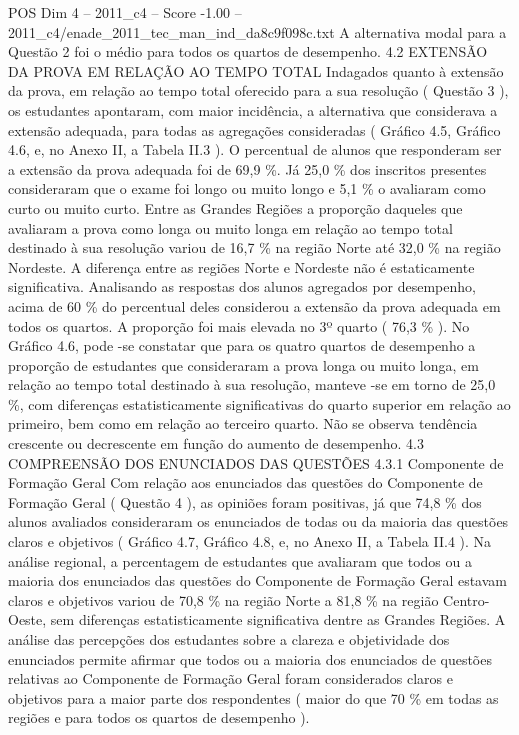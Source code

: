 \begin{textsample}{POS Dim 4 – 2011\_c4 – Score -1.00 – 2011\_c4/enade\_2011\_tec\_man\_ind\_da8c9f098c.txt}
A alternativa modal para a Questão 2 foi o médio para todos os quartos de desempenho. 4.2 EXTENSÃO DA PROVA EM RELAÇÃO AO TEMPO TOTAL Indagados quanto à extensão da prova, em relação ao tempo total oferecido para a sua resolução ( Questão 3 ), os estudantes apontaram, com maior incidência, a alternativa que considerava a extensão adequada, para todas as agregações consideradas ( Gráfico 4.5, Gráfico 4.6, e, no Anexo II, a Tabela II.3 ).
O percentual de alunos que responderam ser a extensão da prova adequada foi de 69,9 \%.
Já 25,0 \% dos inscritos presentes consideraram que o exame foi longo ou muito longo e 5,1 \% o avaliaram como curto ou muito curto.
Entre as Grandes Regiões a proporção daqueles que avaliaram a prova como longa ou muito longa em relação ao tempo total destinado à sua resolução variou de 16,7 \% na região Norte até 32,0 \% na região Nordeste.
A diferença entre as regiões Norte e Nordeste não é estaticamente significativa.
Analisando as respostas dos alunos agregados por desempenho, acima de 60 \% do percentual deles considerou a extensão da prova adequada em todos os quartos.
A proporção foi mais elevada no 3º quarto ( 76,3 \% ).
No Gráfico 4.6, pode -se constatar que para os quatro quartos de desempenho a proporção de estudantes que consideraram a prova longa ou muito longa, em relação ao tempo total destinado à sua resolução, manteve -se em torno de 25,0 \%, com diferenças estatisticamente significativas do quarto superior em relação ao primeiro, bem como em relação ao terceiro quarto.
Não se observa tendência crescente ou decrescente em função do aumento de desempenho. 4.3 COMPREENSÃO DOS ENUNCIADOS DAS QUESTÕES 4.3.1 Componente de Formação Geral Com relação aos enunciados das questões do Componente de Formação Geral ( Questão 4 ), as opiniões foram positivas, já que 74,8 \% dos alunos avaliados consideraram os enunciados de todas ou da maioria das questões claros e objetivos ( Gráfico 4.7, Gráfico 4.8, e, no Anexo II, a Tabela II.4 ).
Na análise regional, a percentagem de estudantes que avaliaram que todos ou a maioria dos enunciados das questões do Componente de Formação Geral estavam claros e objetivos variou de 70,8 \% na região Norte a 81,8 \% na região Centro-Oeste, sem diferenças estatisticamente significativa dentre as Grandes Regiões.
A análise das percepções dos estudantes sobre a clareza e objetividade dos enunciados permite afirmar que todos ou a maioria dos enunciados de questões relativas ao Componente de Formação Geral foram considerados claros e objetivos para a maior parte dos respondentes ( maior do que 70 \% em todas as regiões e para todos os quartos de desempenho ).

\end{textsample}
